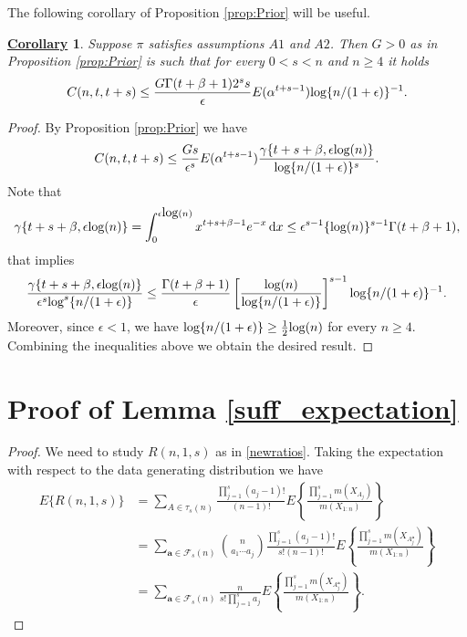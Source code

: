 \documentclass[12pt]{article}
\newtheorem{Cor}{\underline{\bf Corollary}}
\def \d {\mathrm{d}}
\def\log{\hbox{log}}
\begin{document}
The following corollary of Proposition \ref{prop:Prior} will be useful.
\begin{Cor}\label{cor_C}
Suppose $\pi$ satisfies assumptions $A1$ and $A2$. Then $G >0$ as in Proposition \ref{prop:Prior} is such that for every $0 < s < n$ and $n \geq 4$ it holds
\[
\begin{aligned}
C(n,t,t+s) \leq \frac{G\Gamma(t+\beta+1)2^ss}{\epsilon}E(\alpha^{t+s-1})\log\{n/(1+\epsilon)\}^{-1}.
\end{aligned}
\]
\end{Cor}
\begin{proof}
By Proposition \ref{prop:Prior} we have
\[
C(n,t,t+s) \leq \frac{Gs}{\epsilon^s}E(\alpha^{t+s-1})\frac{\gamma\{t+s+\beta,\epsilon\log(n)\}}{\log\{n/(1+\epsilon)\}^{s}}.
\]
Note that
\[
\gamma\{t+s+\beta,\epsilon\log(n)\} = \int_0^{\epsilon \log (n)} x^{t+s+\beta-1}e^{-x}  \, \d x \leq \epsilon^{s-1}\{\log (n) \}^{s-1}\Gamma(t+\beta+1),
\]
that implies
\[
\frac{\gamma\{t+s+\beta,\epsilon\log(n)\}}{\epsilon^s \log^s\{n/(1+\epsilon)\}} \leq \frac{\Gamma(t+\beta+1)}{\epsilon}\left[\frac{\log(n)}{\log\{n/(1+\epsilon)\}} \right]^{s-1}\log\{n/(1+\epsilon)\}^{-1}.
\]
Moreover, since $\epsilon < 1$, we have $\log\{n/(1+\epsilon)\} \geq \frac{1}{2}\log(n)$ for every $n \geq 4$.
Combining the inequalities above we obtain the desired result.
\end{proof}

\section{Proof of Lemma \ref{suff_expectation}}
\begin{proof}
We need to study $R(n,1,s)$ as in \eqref{newratios}. Taking the expectation with respect to the data generating distribution we have
\begin{align*}
E\{R(n,1,s)\} &= \sum_{A \in \tau_s(n)} \frac{\prod_{j=1}^s (a_j-1)! }{(n-1)! } E\left\{\frac{\prod_{j=1}^s m(X_{A_j})}{m(X_{1:n})}\right\}\\
&=	\sum_{\bm{a} \in \mathcal{F}_s(n)} \binom{n}{a_1 \cdots a_j} \frac{\prod_{j=1}^s (a_j-1)! }{s! (n-1)! } E\left\{\frac{\prod_{j=1}^s m(X_{A_j^{\bm{a}}})}{m(X_{1:n})}\right\}\\
&=\sum_{\bm{a} \in \mathcal{F}_s(n)} \frac{n}{s! \prod_{j=1}^{s} a_j}  E\left\{\frac{\prod_{j=1}^s m(X_{A_j^{\bm{a}}})}{m(X_{1:n})}\right\}.
\end{align*}
\end{proof}
\end{document}
